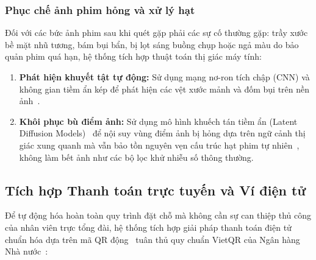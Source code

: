 \subsubsection{Phục chế ảnh phim hỏng và xử lý hạt}
Đối với các bức ảnh phim sau khi quét gặp phải các sự cố thường gặp: trầy xước bề mặt nhũ tương, bám bụi bẩn, bị lọt sáng buồng chụp hoặc ngả màu do bảo quản phim quá hạn, hệ thống tích hợp thuật toán thị giác máy tính:
\begin{enumerate}[leftmargin=2em]
    \item \textbf{Phát hiện khuyết tật tự động:} Sử dụng mạng nơ-ron tích chập (CNN) và không gian tiềm ẩn kép để phát hiện các vệt xước mảnh và đốm bụi trên nền ảnh~\cite{wan2023old}.
    \item \textbf{Khôi phục bù điểm ảnh:} Sử dụng mô hình khuếch tán tiềm ẩn (Latent Diffusion Models)~\cite{rombach2022high} để nội suy vùng điểm ảnh bị hỏng dựa trên ngữ cảnh thị giác xung quanh mà vẫn bảo tồn nguyên vẹn cấu trúc hạt phim tự nhiên~\cite{su2024deep}, không làm bết ảnh như các bộ lọc khử nhiễu số thông thường.
\end{enumerate}

\subsection{Tích hợp Thanh toán trực tuyến và Ví điện tử}
Để tự động hóa hoàn toàn quy trình đặt chỗ mà không cần sự can thiệp thủ công của nhân viên trực tổng đài, hệ thống tích hợp giải pháp thanh toán điện tử chuẩn hóa dựa trên mã QR động~\cite{wicaksono2023utilizing} tuân thủ quy chuẩn VietQR của Ngân hàng Nhà nước~\cite{sbv2021vietqr}:

